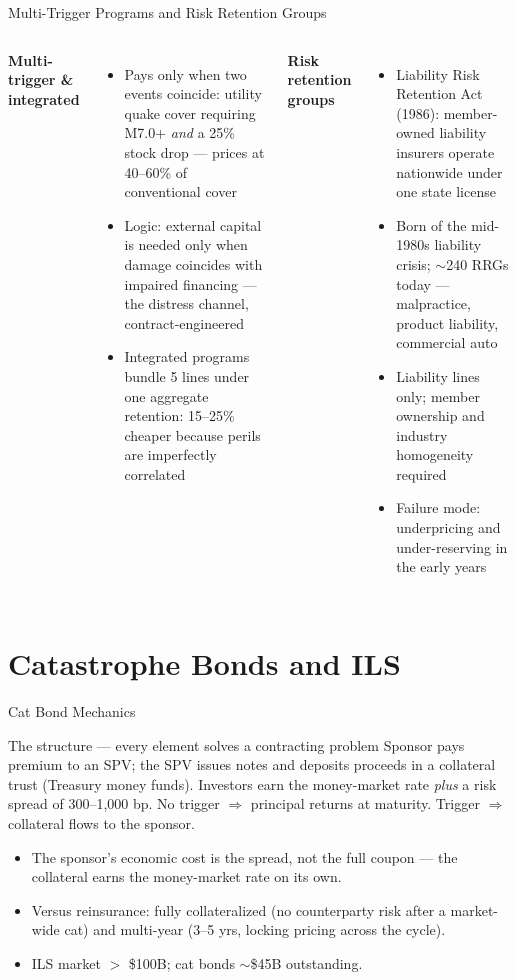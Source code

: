 \documentclass[11pt, aspectratio=169]{beamer}
\begin{document}
\begin{frame}{Multi-Trigger Programs and Risk Retention Groups}
\begin{columns}[T]
\textbf{Multi-trigger \& integrated}
\begin{itemize}
  \item Pays only when two events coincide: utility quake cover requiring M7.0+ \emph{and} a 25\% stock drop --- prices at 40--60\% of conventional cover
  \item Logic: external capital is needed only when damage coincides with impaired financing --- the distress channel, contract-engineered
  \item Integrated programs bundle 5 lines under one aggregate retention: 15--25\% cheaper because perils are imperfectly correlated
\end{itemize}
\textbf{Risk retention groups}
\begin{itemize}
  \item Liability Risk Retention Act (1986): member-owned liability insurers operate nationwide under \alert{one state license}
  \item Born of the mid-1980s liability crisis; $\sim$240 RRGs today --- malpractice, product liability, commercial auto
  \item Liability lines only; member ownership and industry homogeneity required
  \item Failure mode: underpricing and under-reserving in the early years
\end{itemize}
\end{columns}
\end{frame}

\section{Catastrophe Bonds and ILS}

\begin{frame}{Cat Bond Mechanics}
\begin{block}{The structure --- every element solves a contracting problem}
Sponsor pays premium to an \alert{SPV}; the SPV issues notes and deposits proceeds in a \alert{collateral trust} (Treasury money funds). Investors earn the money-market rate \emph{plus} a risk spread of 300--1{,}000 bp. No trigger $\Rightarrow$ principal returns at maturity. Trigger $\Rightarrow$ collateral flows to the sponsor.
\end{block}
\medskip
\begin{itemize}
  \item The sponsor's economic cost is the \alert{spread}, not the full coupon --- the collateral earns the money-market rate on its own.
  \item Versus reinsurance: \alert{fully collateralized} (no counterparty risk after a market-wide cat) and \alert{multi-year} (3--5 yrs, locking pricing across the cycle).
  \item ILS market $>$ \$100B; cat bonds $\sim$\$45B outstanding.
\end{itemize}
\end{frame}
\end{document}
